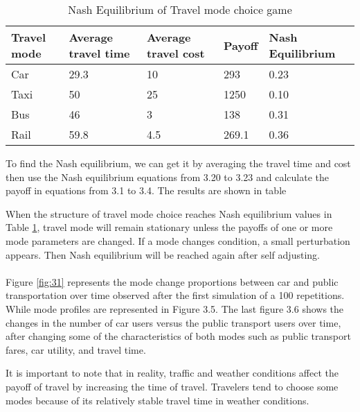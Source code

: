 \begin{table}[h!]
\centering
\begin{tabular}{lllll}
\hline
\multicolumn{1}{l}{Travel mode} & \multicolumn{1}{l}{Average travel time} & \multicolumn{1}{l}{Average travel cost} & \multicolumn{1}{l}{Payoff} & Nash~ Equilibrium  \\ 
\hline
Car                             & 29.3                                    & 10                                      & 293                        & 0.23               \\
Taxi                            & 50                                      & 25                                      & 1250                       & 0.10               \\
Bus                             & 46                                      & 3                                       & 138                        & 0.31               \\
Rail                            & 59.8                                    & 4.5                           & 269.1                      
& 0.36                   
\end{tabular}
\caption{Nash Equilibrium of Travel mode choice game}
\label{table:2}
\end{table}

To find the Nash equilibrium, we can get it by averaging the travel time and cost then use the Nash equilibrium equations from 3.20 to 3.23 and calculate the payoff in equations from 3.1 to 3.4. The results are shown in table

When the structure of travel mode choice reaches Nash equilibrium values in Table \ref{table:2}, travel mode will remain stationary unless the payoffs of one or more mode parameters are changed. If a mode changes condition, a small perturbation appears. Then Nash equilibrium will be reached again after self adjusting.
\paragraph{}
Figure \ref{fig:31} represents the mode change proportions between car and public transportation over time observed after the first simulation of a 100 repetitions. While mode profiles are represented in Figure 3.5. The last figure 3.6 shows the changes in the number of car users versus the public transport users over time, after changing some of the characteristics of both modes such as public transport fares, car utility, and travel time.

It is important to note that in reality, traffic and weather conditions affect the payoff of travel by increasing the time of travel. Travelers tend to choose some modes because of its relatively stable travel time in weather conditions.


